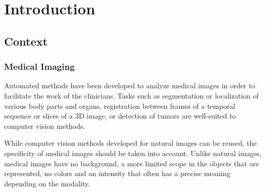 \chapter{Introduction}
\label{chap:intro}





\section{Context}

\subsection{Medical Imaging}


Automated methods have been developed to analyze medical images in order to facilitate the work of the clinicians. Tasks such as segmentation or localization of various body parts and organs, registration between frames of a temporal sequence or slices of a 3D image, or detection of tumors are well-suited to computer vision methods.

While computer vision methods developed for natural images can be reused, the specificity of medical images should be taken into account. Unlike natural images, medical images have no background, a more limited scope in the objects that are represented, no colors and an intensity that often has a precise meaning depending on the modality.

